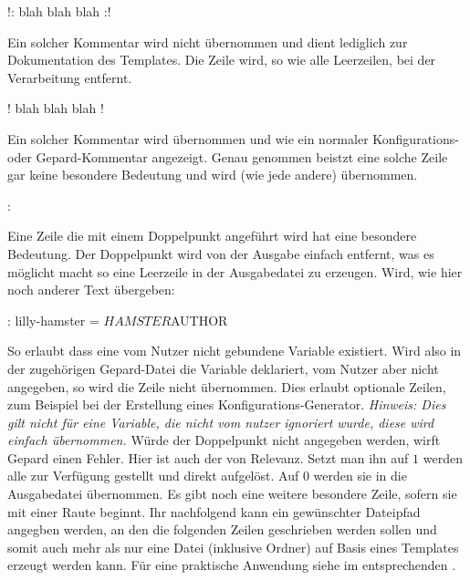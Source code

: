 \begin{gepard*}
!: blah blah blah :!
\end{gepard*}
Ein solcher Kommentar wird nicht übernommen und dient lediglich zur Dokumentation des Templates. Die Zeile wird, so wie alle Leerzeilen, bei der Verarbeitung entfernt.
\begin{gepard*}
! blah blah blah !
\end{gepard*}
Ein solcher Kommentar wird übernommen und wie ein normaler Konfigurations- oder Gepard-Kommentar angezeigt. Genau genommen beistzt eine solche Zeile gar keine besondere Bedeutung und wird (wie jede andere) übernommen.
\begin{gepard*}
:
\end{gepard*}
Eine Zeile die mit einem Doppelpunkt angeführt wird hat eine besondere Bedeutung. Der Doppelpunkt wird von der Ausgabe einfach entfernt, was es möglicht macht so eine Leerzeile in der Ausgabedatei zu erzeugen. Wird, wie hier noch anderer Text übergeben:
\begin{gepard*}
: lilly-hamster =     ${HAMSTER} ${AUTHOR}
\end{gepard*}
So erlaubt \Jake[,] dass eine vom Nutzer nicht gebundene Variable existiert. Wird also in der zugehörigen Gepard-Datei die Variable  deklariert, vom Nutzer aber nicht angegeben, so wird die Zeile nicht übernommen. Dies erlaubt optionale Zeilen, zum Beispiel bei der Erstellung eines Konfigurations-Generator.
\textit{Hinweis: Dies gilt \emph{nicht} für eine Variable, die nicht vom nutzer ignoriert wurde, diese wird einfach übernommen.} Würde der Doppelpunkt nicht angegeben werden, wirft Gepard einen Fehler. Hier ist auch der  von Relevanz. Setzt man ihn auf $1$ werden alle  zur Verfügung gestellt und direkt aufgelöst. Auf $0$ werden sie in die Ausgabedatei übernommen. \newline
Es gibt noch eine weitere besondere Zeile, sofern sie mit einer Raute beginnt. Ihr nachfolgend kann ein gewünschter Dateipfad angegben werden, an den die folgenden Zeilen geschrieben werden sollen und somit auch mehr als nur eine Datei (inklusive Ordner) auf Basis eines Templates erzeugt werden kann. Für eine praktische Anwendung siehe im entsprechenden .
